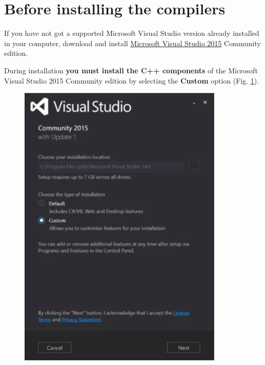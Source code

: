 \documentclass[10pt,a4paper,oneside]{article}
\begin{document}
\section*{Before installing the compilers}
If you have not got a supported Microsoft Visual Studio version already installed in your computer, download and install \href{https://www.microsoft.com/en-us/download/details.aspx?id=48146}{Microsoft Visual Studio 2015} Community edition. 

During installation \textbf{you must install the C++ components} of the Microsoft Visual Studio 2015 Community edition by selecting the \textbf{Custom} option (Fig. \ref{fig:VS1}).
\begin{figure}[!ht]
\centering
\includegraphics[scale=0.55]{VS1.png}
\caption{}
\label{fig:VS1}
\end{figure}
\end{document}
